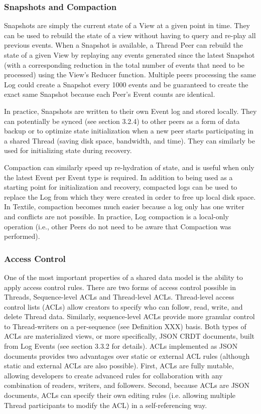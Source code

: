 \documentclass{comjnl}
\begin{document}
\subsubsection{Snapshots and Compaction}

Snapshots are simply the current state of a View at a given point in time. They can be used to rebuild the state of a view without having to query and re-play all previous events. When a Snapshot is available, a Thread Peer can rebuild the state of a given View by replaying any events generated since the latest Snapshot (with a corresponding reduction in the total number of events that need to be processed) using the View’s Reducer function. Multiple peers processing the same Log could create a Snapshot every 1000 events and be guaranteed to create the exact same Snapshot because each Peer’s Event counts are identical. 

In practice, Snapshots are written to their own Event log and stored locally. They can potentially be synced (see section 3.2.4) to other peers as a form of data backup or to optimize state initialization when a new peer starts participating in a shared Thread (saving disk space, bandwidth, and time). They can similarly be used for initializing state during recovery.

Compaction can similarly speed up re-hydration of state, and is useful when only the latest Event per Event type is required. In addition to being used as a starting point for initialization and recovery, compacted logs can be used to replace the Log from which they were created in order to free up local disk space. In Textile, compaction becomes much easier because a log only has one writer and conflicts are not possible. In practice, Log compaction is a local-only operation (i.e., other Peers do not need to be aware that Compaction was performed).

\subsubsection{Access Control} \label{sec:AccessControl}

One of the most important properties of a shared data model is the ability to apply access control rules. There are two forms of access control possible in Threads, Sequence-level ACLs and Thread-level ACLs. Thread-level access control lists (ACLs) allow creators to specify who can follow, read, write, and delete Thread data. Similarly, sequence-level ACLs provide more granular control to Thread-writers on a per-sequence (see Definition XXX) basis. Both types of ACLs are materialized views, or more specifically, JSON CRDT documents, built from Log Events (see section 3.3.2 for details). ACLs implemented as JSON documents provides two advantages over static or external ACL rules (although static and external ACLs are also possible). First, ACLs are fully mutable, allowing developers to create advanced rules for collaboration with any combination of readers, writers, and followers. Second, because ACLs are JSON documents, ACLs can specify their own editing rules (i.e. allowing multiple Thread participants to modify the ACL) in a self-referencing way.
\end{document}
